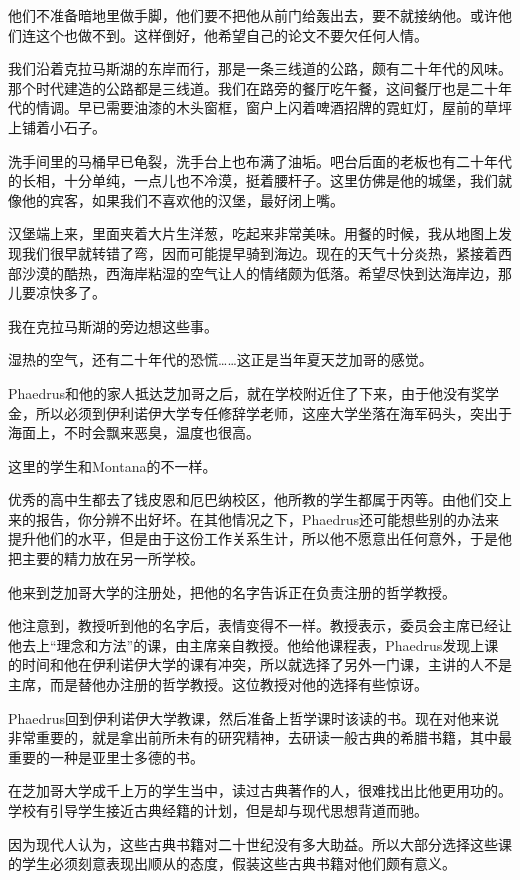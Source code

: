 \documentclass[UTF8]{article}
\begin{document}
\par 他们不准备暗地里做手脚，他们要不把他从前门给轰出去，要不就接纳他。或许他们连这个也做不到。这样倒好，他希望自己的论文不要欠任何人情。
\par 我们沿着克拉马斯湖的东岸而行，那是一条三线道的公路，颇有二十年代的风味。那个时代建造的公路都是三线道。我们在路旁的餐厅吃午餐，这间餐厅也是二十年代的情调。早已需要油漆的木头窗框，窗户上闪着啤酒招牌的霓虹灯，屋前的草坪上铺着小石子。
\par 洗手间里的马桶早已龟裂，洗手台上也布满了油垢。吧台后面的老板也有二十年代的长相，十分单纯，一点儿也不冷漠，挺着腰杆子。这里仿佛是他的城堡，我们就像他的宾客，如果我们不喜欢他的汉堡，最好闭上嘴。
\par 汉堡端上来，里面夹着大片生洋葱，吃起来非常美味。用餐的时候，我从地图上发现我们很早就转错了弯，因而可能提早骑到海边。现在的天气十分炎热，紧接着西部沙漠的酷热，西海岸粘湿的空气让人的情绪颇为低落。希望尽快到达海岸边，那儿要凉快多了。
\par 我在克拉马斯湖的旁边想这些事。
\par 湿热的空气，还有二十年代的恐慌……这正是当年夏天芝加哥的感觉。
\par Phaedrus和他的家人抵达芝加哥之后，就在学校附近住了下来，由于他没有奖学金，所以必须到伊利诺伊大学专任修辞学老师，这座大学坐落在海军码头，突出于海面上，不时会飘来恶臭，温度也很高。
\par 这里的学生和Montana的不一样。
\par 优秀的高中生都去了钱皮恩和厄巴纳校区，他所教的学生都属于丙等。由他们交上来的报告，你分辨不出好坏。在其他情况之下，Phaedrus还可能想些别的办法来提升他们的水平，但是由于这份工作关系生计，所以他不愿意出任何意外，于是他把主要的精力放在另一所学校。
\par 他来到芝加哥大学的注册处，把他的名字告诉正在负责注册的哲学教授。
\par 他注意到，教授听到他的名字后，表情变得不一样。教授表示，委员会主席已经让他去上“理念和方法”的课，由主席亲自教授。他给他课程表，Phaedrus发现上课的时间和他在伊利诺伊大学的课有冲突，所以就选择了另外一门课，主讲的人不是主席，而是替他办注册的哲学教授。这位教授对他的选择有些惊讶。
\par Phaedrus回到伊利诺伊大学教课，然后准备上哲学课时该读的书。现在对他来说非常重要的，就是拿出前所未有的研究精神，去研读一般古典的希腊书籍，其中最重要的一种是亚里士多德的书。
\par 在芝加哥大学成千上万的学生当中，读过古典著作的人，很难找出比他更用功的。学校有引导学生接近古典经籍的计划，但是却与现代思想背道而驰。
\par 因为现代人认为，这些古典书籍对二十世纪没有多大助益。所以大部分选择这些课的学生必须刻意表现出顺从的态度，假装这些古典书籍对他们颇有意义。
\end{document}
